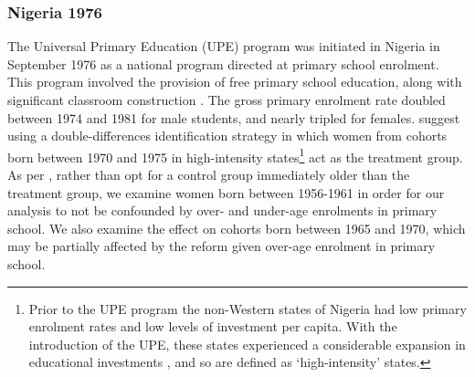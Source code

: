 \documentclass{article}[12pt,subeqn]
\begin{document}
\begin{spacing}{1.4}
\subsubsection{Nigeria 1976}
\label{ssscn:empiricsNigeria}
The Universal Primary Education (UPE) program was initiated in Nigeria in 
September 1976 as a national program directed at primary school enrolment. This 
program involved the provision of free primary school education, along with 
significant classroom construction \citep{OsiliLong2008}. The gross primary 
enrolment rate doubled between 1974 and 1981 for male students, and nearly 
tripled for females.  \citet{OsiliLong2008} suggest using a double-differences 
identification strategy in which women from cohorts born between 1970 and 1975 in 
high-intensity states\footnote{Prior to the UPE program the non-Western states of 
Nigeria had low primary enrolment rates and low levels of investment per capita.  
With the introduction of the UPE, these states experienced a considerable 
expansion in educational investments \citep{OsiliLong2008}, and so are defined as 
`high-intensity' states.} act as the treatment group. As per 
\citeauthor{OsiliLong2008}, rather than opt for a control group immediately older 
than the treatment group, we examine women born between 1956-1961 in order for our 
analysis to not be confounded by over- and under-age enrolments in primary school.  
We also examine the effect on cohorts born between 1965 and 1970, which may be 
partially affected by the reform given over-age enrolment in primary school.


\end{spacing}
\end{document}
